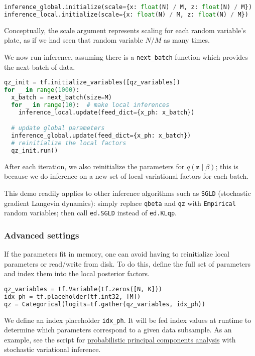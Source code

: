 \begin{lstlisting}[language=Python]
inference_global.initialize(scale={x: float(N) / M, z: float(N) / M})
inference_local.initialize(scale={x: float(N) / M, z: float(N) / M})
\end{lstlisting}

Conceptually, the scale argument represents scaling for each random
variable’s plate, as if we had seen that random variable $N/M$ as many
times.

We now run inference, assuming there is a \texttt{next_batch} function
which provides the next batch of data.

\begin{lstlisting}[language=Python]
qz_init = tf.initialize_variables([qz_variables])
for _ in range(1000):
  x_batch = next_batch(size=M)
  for _ in range(10):  # make local inferences
    inference_local.update(feed_dict={x_ph: x_batch})

  # update global parameters
  inference_global.update(feed_dict={x_ph: x_batch})
  # reinitialize the local factors
  qz_init.run()
\end{lstlisting}

After each iteration, we also reinitialize the parameters for
$q(\mathbf{z}\mid\beta)$; this is because we do inference on a new
set of local variational factors for each batch.

This demo readily applies to other inference algorithms such as
\texttt{SGLD} (stochastic gradient Langevin dynamics): simply
replace \texttt{qbeta} and \texttt{qz} with \texttt{Empirical} random
variables; then call \texttt{ed.SGLD} instead of \texttt{ed.KLqp}.

\subsubsection{Advanced settings}

If the parameters fit in memory, one can avoid having to reinitialize
local parameters or read/write from disk.  To do this, define the full
set of parameters and index them into the local posterior factors.

\begin{lstlisting}[language=Python]
qz_variables = tf.Variable(tf.zeros([N, K]))
idx_ph = tf.placeholder(tf.int32, [M])
qz = Categorical(logits=tf.gather(qz_variables, idx_ph))
\end{lstlisting}

We define an index placeholder \texttt{idx_ph}. It will be fed index
values at runtime to determine which parameters correspond to a given
data subsample.
As an example, see the script for
\href{https://github.com/blei-lab/edward/blob/master/examples/probabilistic_pca_subsampling.py}
{probabilistic principal components analysis} with stochastic
variational inference.

